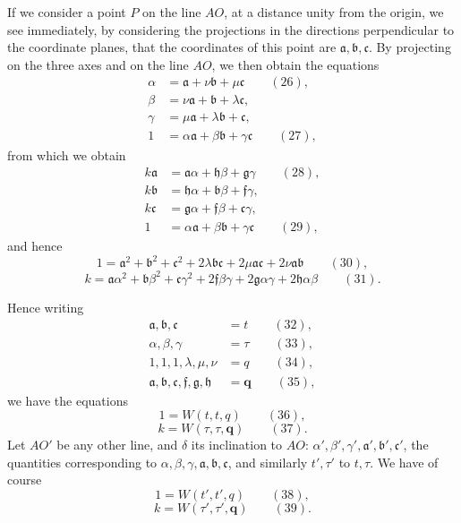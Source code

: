 \documentclass[11pt]{article}
\begin{document}
If we consider a point $P$ on the line $AO$, at a distance unity from the origin, we see immediately, by considering the projections in the directions perpendicular to the coordinate planes, that the coordinates of this point are $\mathfrak{a}, \mathfrak{b}, \mathfrak{c}$. By projecting on the three axes and on the line $AO$, we then obtain the equations
\begin{align*}
\alpha &= \mathfrak{a} + \nu\mathfrak{b} + \mu\mathfrak{c} \qquad (26),\\
\beta &= \nu\mathfrak{a} + \mathfrak{b} + \lambda\mathfrak{c},\\
\gamma &= \mu\mathfrak{a} + \lambda\mathfrak{b} + \mathfrak{c},\\
1 &= \alpha\mathfrak{a} + \beta\mathfrak{b} + \gamma\mathfrak{c} \qquad (27),
\end{align*}
from which we obtain
\begin{align*}
k\mathfrak{a} &= \mathfrak{a}\alpha + \mathfrak{h}\beta + \mathfrak{g}\gamma \qquad (28),\\
k\mathfrak{b} &= \mathfrak{h}\alpha + \mathfrak{b}\beta + \mathfrak{f}\gamma,\\
k\mathfrak{c} &= \mathfrak{g}\alpha + \mathfrak{f}\beta + \mathfrak{c}\gamma,\\
1 &= \alpha\mathfrak{a} + \beta\mathfrak{b} + \gamma\mathfrak{c} \qquad (29),
\end{align*}
and hence
\[
1 = \mathfrak{a}^2 + \mathfrak{b}^2 + \mathfrak{c}^2 + 2\lambda\mathfrak{b}\mathfrak{c} + 2\mu\mathfrak{a}\mathfrak{c} + 2\nu\mathfrak{a}\mathfrak{b} \qquad (30),
\]
\[
k = \mathfrak{a}\alpha^2 + \mathfrak{b}\beta^2 + \mathfrak{c}\gamma^2 + 2\mathfrak{f}\beta\gamma + 2\mathfrak{g}\alpha\gamma + 2\mathfrak{h}\alpha\beta \qquad (31).
\]

Hence writing
\begin{align*}
\mathfrak{a}, \mathfrak{b}, \mathfrak{c} &= t \qquad (32),\\
\alpha, \beta, \gamma &= \tau \qquad (33),\\
1, 1, 1, \lambda, \mu, \nu &= q \qquad (34),\\
\mathfrak{a}, \mathfrak{b}, \mathfrak{c}, \mathfrak{f}, \mathfrak{g}, \mathfrak{h} &= \mathbf{q} \qquad (35),
\end{align*}
we have the equations
\[
1 = W(t, t, q) \qquad (36),
\]
\[
k = W(\tau, \tau, \mathbf{q}) \qquad (37).
\]
Let $AO'$ be any other line, and $\delta$ its inclination to $AO$: $\alpha', \beta', \gamma', \mathfrak{a}', \mathfrak{b}', \mathfrak{c}'$, the quantities corresponding to $\alpha, \beta, \gamma, \mathfrak{a}, \mathfrak{b}, \mathfrak{c}$, and similarly $t', \tau'$ to $t, \tau$. We have of course
\[
1 = W(t', t', q) \qquad (38),
\]
\[
k = W(\tau', \tau', \mathbf{q}) \qquad (39).
\]
\end{document}
